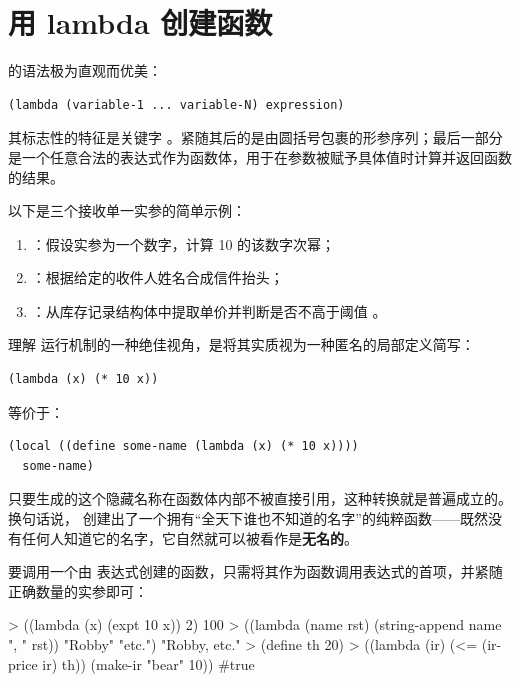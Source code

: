 \section{用 lambda 创建函数}
\label{sec:17_1}

 的语法极为直观而优美：

\begin{lstlisting}[language=BSL]
(lambda (variable-1 ... variable-N) expression)
\end{lstlisting}

其标志性的特征是关键字 。紧随其后的是由圆括号包裹的形参序列；最后一部分是一个任意合法的表达式作为函数体，用于在参数被赋予具体值时计算并返回函数的结果。

以下是三个接收单一实参的简单示例：
\begin{enumerate}
  \item {}：假设实参为一个数字，计算 10 的该数字次幂；
  \item {}：根据给定的收件人姓名合成信件抬头；
  \item {}：从库存记录结构体中提取单价并判断是否不高于阈值 。
\end{enumerate}

理解  运行机制的一种绝佳视角，是将其实质视为一种匿名的局部定义简写：
\begin{lstlisting}[language=BSL]
(lambda (x) (* 10 x))
\end{lstlisting}
等价于：
\begin{lstlisting}[language=BSL]
(local ((define some-name (lambda (x) (* 10 x))))
  some-name)
\end{lstlisting}

只要生成的这个隐藏名称在函数体内部不被直接引用，这种转换就是普遍成立的。换句话说， 创建出了一个拥有“全天下谁也不知道的名字”的纯粹函数——既然没有任何人知道它的名字，它自然就可以被看作是\textbf{无名的}。

要调用一个由  表达式创建的函数，只需将其作为函数调用表达式的首项，并紧随正确数量的实参即可：

\begin{replbox}
> ((lambda (x) (expt 10 x)) 2)
100
> ((lambda (name rst) (string-append name ", " rst)) "Robby" "etc.")
"Robby, etc."
> (define th 20)
> ((lambda (ir) (<= (ir-price ir) th)) (make-ir "bear" 10))
#true
\end{replbox}


